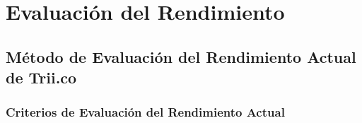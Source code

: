 \documentclass[
  paper=a4,
  ,captions=tableheading
]{scrartcl}
\renewenvironment{quote}{\begin{customblockquote}\list{}{\rightmargin=0em\leftmargin=0em}%
\item\relax\color{blockquote-text}\ignorespaces}{\unskip\unskip\endlist\end{customblockquote}}
\begin{document}
\newpage

\section{Evaluación del
Rendimiento}\label{sec:evaluaciuxf3n-del-rendimiento}

\subsection{Método de Evaluación del Rendimiento Actual de
Trii.co}\label{sec:muxe9todo-de-evaluaciuxf3n-del-rendimiento-actual-de-trii.co}

\begin{quote}
\end{quote}

\subsubsection{Criterios de Evaluación del Rendimiento
Actual}\label{sec:criterios-de-evaluaciuxf3n-del-rendimiento-actual}
\end{document}
